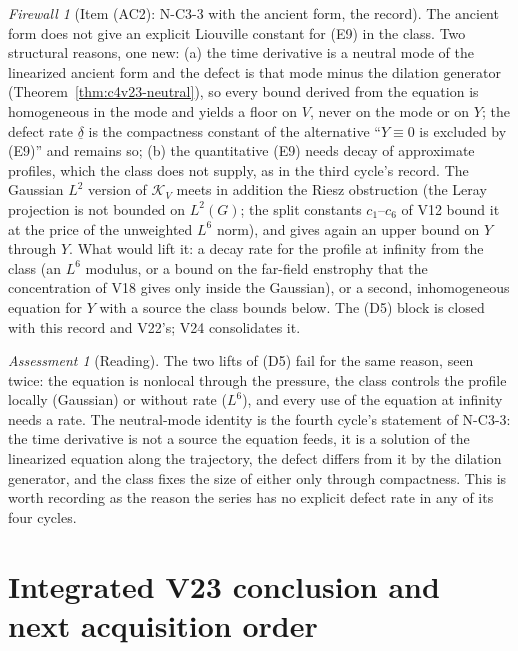 \documentclass[11pt]{article}
\theoremstyle{plain}
\theoremstyle{definition}
\theoremstyle{remark}
\newtheorem{assessment}[theorem]{Assessment}
\newtheorem{firewall}[theorem]{Firewall}
\begin{document}
\begin{firewall}[Item (AC2): N-C3-3 with the ancient form, the record]
\label{fw:c4v23-record}
The ancient form does not give an explicit Liouville constant for
(E9) in the class.  Two structural reasons, one new: (a) the
time derivative is a neutral mode of the linearized ancient form and
the defect is that mode minus the dilation generator
(Theorem~\ref{thm:c4v23-neutral}), so every bound derived from the
equation is homogeneous in the mode and yields a floor on \(V\), never
on the mode or on \(Y\);
the defect rate \(\underline\delta\) is the compactness constant of the
alternative ``\(Y\equiv0\) is excluded by (E9)'' and remains so; (b) the
quantitative (E9) needs decay of approximate profiles, which the
class does not supply, as in the third cycle's record.  The Gaussian
\(L^2\) version of \(\mathcal K_V\) meets in addition the Riesz obstruction (the Leray
projection is not bounded on \(L^2(G)\); the split constants \(c_1\)--\(c_6\)
of V12 bound it at the price of the unweighted \(L^6\) norm), and gives
again an upper bound on \(Y\) through \(Y\).  What would lift it: a decay
rate for the profile at infinity from the class (an \(L^6\) modulus, or a
bound on the far-field enstrophy that the concentration of V18 gives
only inside the Gaussian), or a second, inhomogeneous equation for
\(Y\) with a source the class bounds below.  The (D5) block is closed
with this record and V22's; V24 consolidates it.
\end{firewall}

\begin{assessment}[Reading]
\label{ass:c4v23-reading}
The two lifts of (D5) fail for the same reason, seen twice: the
equation is nonlocal through the pressure, the class controls the
profile locally (Gaussian) or without rate (\(L^6\)), and every use of
the equation at infinity needs a rate.  The neutral-mode identity is
the fourth cycle's statement of N-C3-3: the time derivative is not a
source the equation feeds, it is a solution of the linearized
equation along the trajectory, the defect differs from it by the
dilation generator, and the class fixes the size of either only
through compactness.  This is worth recording as the reason the series has
no explicit defect rate in any of its four cycles.
\end{assessment}

\section{Integrated V23 conclusion and next acquisition order}
\label{sec:c4v23-conclusion}
\end{document}
